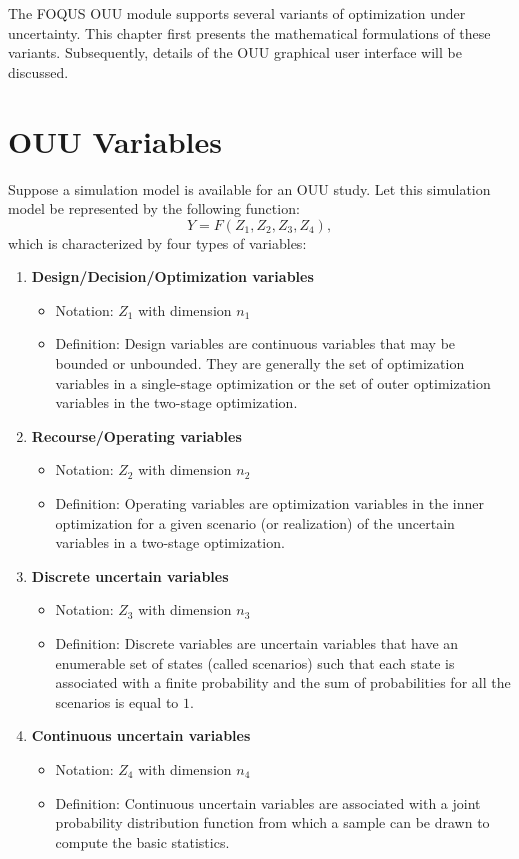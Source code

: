 \label{sec:ouu_overview}

The FOQUS OUU module supports several variants of optimization under 
uncertainty. This chapter first presents the mathematical formulations 
of these variants. Subsequently, details of the OUU graphical user 
interface will be discussed.

\section{OUU Variables}

Suppose a simulation model is available for an OUU study. Let this 
simulation model be represented by the following function:
\begin{equation}
Y = F(Z_1,Z_2,Z_3,Z_4),
\end{equation}
which is characterized by four types of variables:
\begin{enumerate}
\item {\textbf{Design/Decision/Optimization variables}
\begin{itemize}
\item{Notation: $Z_1$ with dimension $n_1$}
\item{Definition: Design variables are continuous variables
that may be bounded or unbounded. They are generally the
set of optimization variables in a single-stage optimization
or the set of outer optimization variables in the two-stage
optimization.}
\end{itemize}
}

\item{\textbf{Recourse/Operating variables}
\begin{itemize}
\item{Notation: $Z_2$ with dimension $n_2$} 
\item{Definition: Operating
variables are optimization variables in the inner
optimization for a given scenario (or realization)
of the uncertain variables in a two-stage optimization.}
\end{itemize}
}

\item{\textbf{Discrete uncertain variables}
\begin{itemize}
\item{Notation: $Z_3$ with dimension $n_3$}
\item{Definition: Discrete variables are uncertain
variables that have an enumerable set of states
(called scenarios) such that each state is associated 
with a finite probability and the sum of probabilities
for all the scenarios is equal to $1$.}
\end{itemize}
}

\item{\textbf{Continuous uncertain variables}
\begin{itemize}
\item{Notation: $Z_4$ with dimension $n_4$}
\item{Definition: Continuous uncertain variables are
associated with a joint probability distribution
function from which a sample can be drawn to compute
the basic statistics.}
\end{itemize}
}
\end{enumerate}

